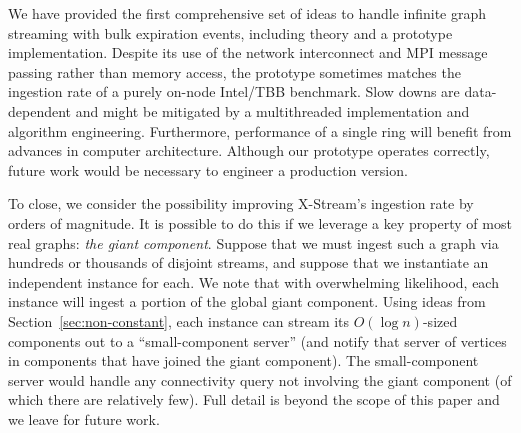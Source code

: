 We have provided the first comprehensive set of ideas to handle
infinite graph streaming with bulk expiration events, including theory
and a prototype implementation.  Despite its use of the network interconnect
and MPI message passing rather than memory access, the prototype sometimes
matches the ingestion rate of a purely on-node Intel/TBB benchmark.  Slow
downs are data-dependent and might be mitigated by a multithreaded
implementation and algorithm engineering.  Furthermore, performance of
a single \XSCC ring will benefit from advances in computer architecture.
Although our prototype operates correctly, future work would be
necessary to engineer a production version.


To close, we consider the possibility improving X-Stream's ingestion
rate by orders of magnitude.  It is
possible to do this if we leverage a key property of most real graphs:
\emph{the giant component}.  Suppose that we must ingest such a graph
via hundreds or thousands of disjoint streams, and suppose that we
instantiate an independent \XSCC instance for each.  We note that with
overwhelming likelihood, each \XSCC instance will ingest a portion of
the global giant component.  Using ideas from Section~\ref{sec:non-constant},
each \XSCC instance can stream its $O(\log n)$-sized components out to
a ``small-component server'' (and notify that server of vertices in
components that have joined the giant component).  The small-component
server would handle any connectivity query not involving the giant
component (of which there are relatively few). Full detail is
beyond the scope of this paper and we leave for future work.
